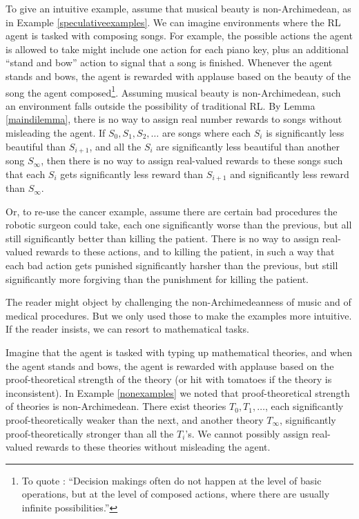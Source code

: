 \documentclass[twoside,11pt]{article}
\begin{document}
\begin{example}
\label{musicalexample}
To give an intuitive example, assume that musical beauty is non-Archimedean,
as in Example \ref{speculativeexamples}. We can imagine environments where the
RL agent is tasked with composing songs. For example, the possible actions the
agent is allowed to take might include one action for each piano key, plus
an additional ``stand and bow'' action to signal that a song is
finished.
Whenever the agent stands and bows, the agent is rewarded with applause based on
the beauty of the song the agent
composed\footnote{To quote \cite{wang2015assumptions}: ``Decision makings often do not happen
at the level of basic operations, but at the level of composed actions, where
there are usually infinite possibilities.''}. Assuming
musical beauty is
non-Archimedean, such an environment falls outside the possibility of traditional
RL. By Lemma \ref{maindilemma}, there is no way to assign real number
rewards to songs without misleading the agent. If $S_0,S_1,S_2,\ldots$ are songs
where each $S_{i}$ is significantly less beautiful than $S_{i+1}$, and
all the $S_i$ are significantly less beautiful than another song $S_\infty$,
then there is no way to
assign real-valued rewards to these songs such that each $S_{i}$ gets
significantly less reward than $S_{i+1}$ and significantly less reward
than $S_\infty$.
\end{example}

Or, to re-use the cancer example, assume there are certain bad procedures the
robotic surgeon could take, each one significantly worse than the previous,
but all still significantly better than killing the patient. There is no way
to assign real-valued rewards to these actions, and to killing the patient,
in such a way that each bad action gets punished significantly harsher than
the previous, but still significantly more forgiving than the punishment for
killing the patient.

The reader might object by challenging the non-Archimedeanness
of music and of medical procedures. But we only used those to make the examples
more intuitive. If the reader insists, we can resort to mathematical tasks.

\begin{example}
\label{theoryexample}
Imagine that the agent is tasked with
typing up mathematical theories, and when the agent stands and bows, the agent
is rewarded with applause based on the proof-theoretical strength of the theory
(or hit with tomatoes if the theory is inconsistent).
In Example \ref{nonexamples} we noted that proof-theoretical strength of theories
is non-Archimedean. There exist theories $T_0,T_1,\ldots$, each significantly
proof-theoretically weaker than the next, and another theory $T_\infty$,
significantly proof-theoretically stronger than all the $T_i$'s. We cannot
possibly assign real-valued rewards to these theories without misleading the
agent.
\end{example}
\end{document}
